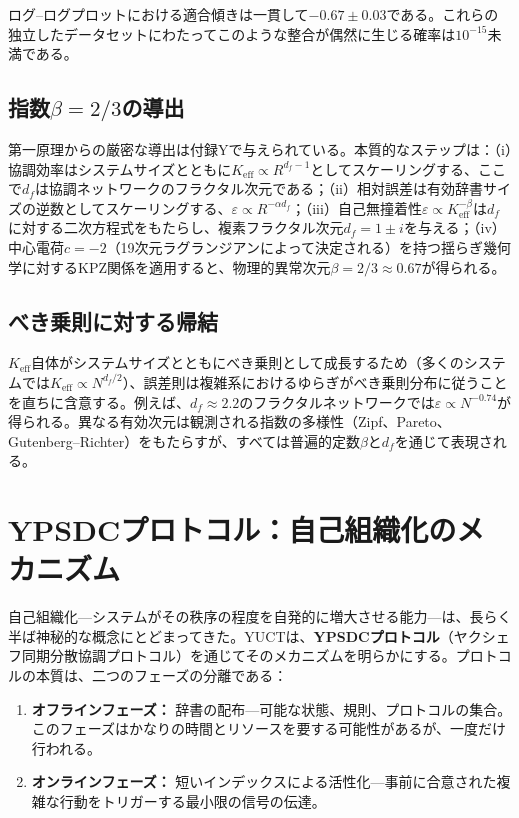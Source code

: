 \documentclass[11pt,a4paper]{article}
\theoremstyle{remark}
\newcommand{\Keff}{K_{\mathrm{eff}}}
\begin{document}
	ログ–ログプロットにおける適合傾きは一貫して\(-0.67 \pm 0.03\)である。これらの独立したデータセットにわたってこのような整合が偶然に生じる確率は\(10^{-15}\)未満である。
	
	\subsection{指数\(\beta = 2/3\)の導出}
	
	第一原理からの厳密な導出は付録Yで与えられている。本質的なステップは：（i）協調効率はシステムサイズとともに\(\Keff \propto R^{d_f-1}\)としてスケーリングする、ここで\(d_f\)は協調ネットワークのフラクタル次元である；（ii）相対誤差は有効辞書サイズの逆数としてスケーリングする、\(\varepsilon \propto R^{-\alpha d_f}\)；（iii）自己無撞着性\(\varepsilon \propto \Keff^{-\beta}\)は\(d_f\)に対する二次方程式をもたらし、複素フラクタル次元\(d_f = 1 \pm i\)を与える；（iv）中心電荷\(c=-2\)（19次元ラグランジアンによって決定される）を持つ揺らぎ幾何学に対するKPZ関係を適用すると、物理的異常次元\(\beta = 2/3 \approx 0.67\)が得られる。
	
	\subsection{べき乗則に対する帰結}
	
	\(\Keff\)自体がシステムサイズとともにべき乗則として成長するため（多くのシステムでは\(\Keff \propto N^{d_f/2}\)）、誤差則は複雑系におけるゆらぎがべき乗則分布に従うことを直ちに含意する。例えば、\(d_f \approx 2.2\)のフラクタルネットワークでは\(\varepsilon \propto N^{-0.74}\)が得られる。異なる有効次元は観測される指数の多様性（Zipf、Pareto、Gutenberg–Richter）をもたらすが、すべては普遍的定数\(\beta\)と\(d_f\)を通じて表現される。
	
	\section{YPSDCプロトコル：自己組織化のメカニズム}
	\label{sec:ypsdc}
	
	自己組織化—システムがその秩序の程度を自発的に増大させる能力—は、長らく半ば神秘的な概念にとどまってきた。YUCTは、\textbf{YPSDCプロトコル}（ヤクシェフ同期分散協調プロトコル）を通じてそのメカニズムを明らかにする。プロトコルの本質は、二つのフェーズの分離である：
	\begin{enumerate}
		\item \textbf{オフラインフェーズ：} 辞書の配布—可能な状態、規則、プロトコルの集合。このフェーズはかなりの時間とリソースを要する可能性があるが、一度だけ行われる。
		\item \textbf{オンラインフェーズ：} 短いインデックスによる活性化—事前に合意された複雑な行動をトリガーする最小限の信号の伝達。
	\end{enumerate}
	
\end{document}
